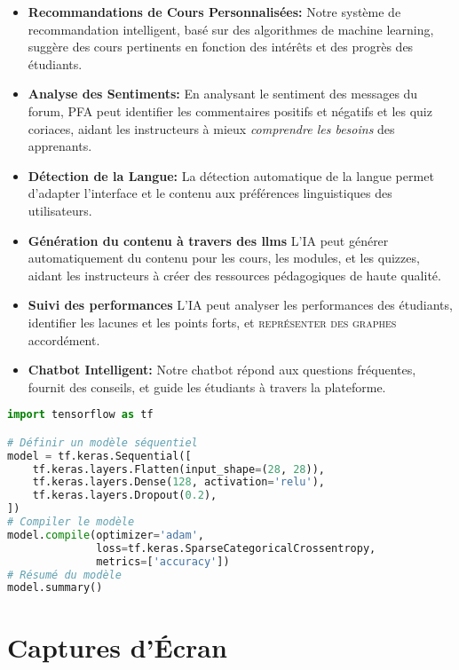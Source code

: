 \begin{itemize}
    \item \textbf{Recommandations de Cours Personnalisées:} Notre système de recommandation intelligent, basé sur des algorithmes de machine learning, suggère des cours pertinents en fonction des intérêts et des progrès des étudiants.
    \item \textbf{Analyse des Sentiments:} En analysant le sentiment des messages du forum, PFA peut identifier les commentaires positifs et négatifs et les quiz coriaces, aidant les instructeurs à mieux \textit{comprendre les besoins} des apprenants.
    \item \textbf{Détection de la Langue:} La détection automatique de la langue permet d'adapter l'interface et le contenu aux préférences linguistiques des utilisateurs.
    \item \textbf{Génération du contenu à travers des \gls{llm}s} L'IA peut générer automatiquement du contenu pour les cours, les modules, et les quizzes, aidant les instructeurs à créer des ressources pédagogiques de haute qualité.
    \item \textbf{Suivi des performances} L'IA peut analyser les performances des étudiants, identifier les lacunes et les points forts, et \textsc{représenter des graphes} accordément.
    \item \textbf{Chatbot Intelligent:} Notre chatbot répond aux questions fréquentes, fournit des conseils, et guide les étudiants à travers la plateforme.
\end{itemize}

\begin{lstlisting}[language=Python, caption={Exemple de Code Python Utilisant TensorFlow}, label={lst:tensorflowexample}, basicstyle=\ttfamily, keywordstyle=\color{blue}, commentstyle=\color{green}, stringstyle=\color{red}]
import tensorflow as tf

# Définir un modèle séquentiel
model = tf.keras.Sequential([
    tf.keras.layers.Flatten(input_shape=(28, 28)),
    tf.keras.layers.Dense(128, activation='relu'),
    tf.keras.layers.Dropout(0.2),
])
# Compiler le modèle
model.compile(optimizer='adam',
              loss=tf.keras.SparseCategoricalCrossentropy,
              metrics=['accuracy'])
# Résumé du modèle
model.summary()
\end{lstlisting}

\section{Captures d'Écran}


